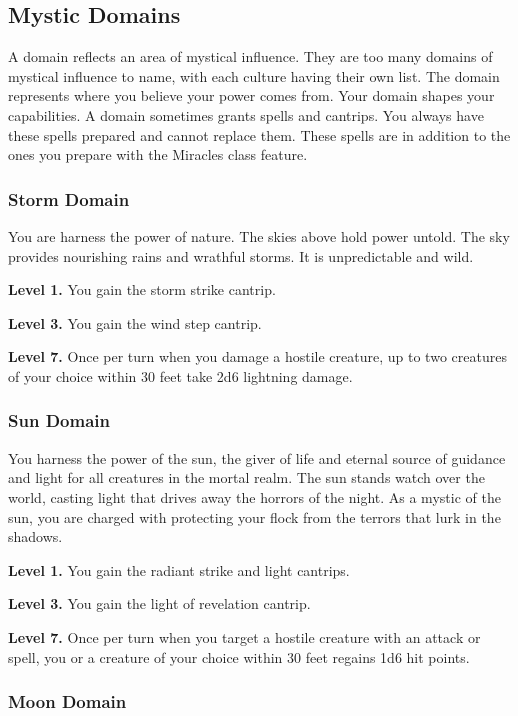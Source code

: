 \documentclass[12pt,letterpaper,twocolumn,openany,nodeprecatedcode,bg=none]{dndbook}
\begin{document}
\subsection{Mystic Domains}\label{mystic-domains}

A domain reflects an area of mystical influence. They are too many
domains of mystical influence to name, with each culture having their
own list. The domain represents where you believe your power comes from.
Your domain shapes your capabilities. A domain sometimes grants spells
and cantrips. You always have these spells prepared and cannot replace
them. These spells are in addition to the ones you prepare with the
Miracles class feature.

\subsubsection{Storm Domain}\label{storm-domain}

You are harness the power of nature. The skies above hold power untold.
The sky provides nourishing rains and wrathful storms. It is
unpredictable and wild.

\textbf{Level 1.} You gain the storm strike cantrip.

\textbf{Level 3.} You gain the wind step cantrip.

\textbf{Level 7.} Once per turn when you damage a hostile creature, up
to two creatures of your choice within 30 feet take 2d6 lightning
damage.

\subsubsection{Sun Domain}\label{sun-domain}

You harness the power of the sun, the giver of life and eternal source
of guidance and light for all creatures in the mortal realm. The sun
stands watch over the world, casting light that drives away the horrors
of the night. As a mystic of the sun, you are charged with protecting
your flock from the terrors that lurk in the shadows.

\textbf{Level 1.} You gain the radiant strike and light cantrips.

\textbf{Level 3.} You gain the light of revelation cantrip.

\textbf{Level 7.} Once per turn when you target a hostile creature with
an attack or spell, you or a creature of your choice within 30 feet
regains 1d6 hit points.

\subsubsection{Moon Domain}\label{moon-domain}
\end{document}
